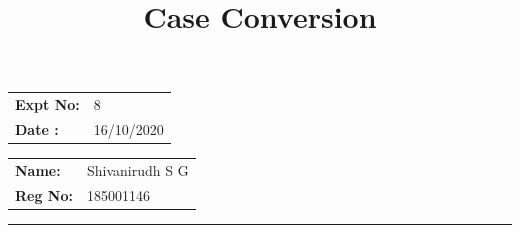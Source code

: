 \documentclass[12pt,a4paper]{article}
\title{\bf Case Conversion}
\author{\vspace{-10ex}}
\date{\vspace{-10ex}}
\begin{document}
\maketitle

\begin{minipage}{0.45\textwidth}
        \begin{tabular}{l l}
            \textbf{Expt No:}&8\\
            \textbf{Date :}&16/10/2020
        \end{tabular}
\end{minipage}%
\begin{minipage}{0.45\textwidth}
        \begin{tabular}{l l}
             \textbf{Name:}& Shivanirudh S G  \\
             \textbf{Reg No:} & 185001146 
        \end{tabular}
\end{minipage}
\vspace{1cm}
\hrule
\end{document}
